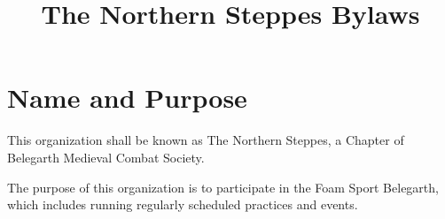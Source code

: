 \documentclass[12pt]{article}
\title{The Northern Steppes Bylaws}
\begin{document}


\section{Name and Purpose}
\begin{level}
\item This organization shall be known as The Northern Steppes, a Chapter of Belegarth Medieval Combat Society.
\item The purpose of this organization is to participate in the Foam Sport Belegarth, which includes running regularly scheduled practices and events.
\end{level}
\end{document}
